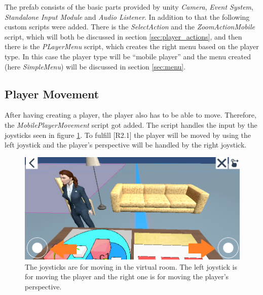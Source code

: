 The \gls{prefab} consists of the basic parts provided by \gls{unity} \textit{Camera}, \textit{Event System}, \textit{Standalone Input Module} and \textit{Audio Listener}.
In addition to that the following custom scripts were added.
There is the \textit{SelectAction} and the \textit{ZoomActionMobile} script, which will both be discussed in section \ref{sec:player_actions}, and then there is the \textit{PLayerMenu} script, which creates the right menu based on the player type.
In this case the player type will be \enquote{mobile player} and the menu created (here \textit{SimpleMenu}) will be discussed in section \ref{sec:menu}.

\subsection{Player Movement}
\label{sec:player_movement}
After having creating a player, the player also has to be able to move.
Therefore, the \textit{MobilePlayerMovement} script got added.
The script handles the input by the joysticks seen in figure \ref{fig:joystick}.
To fulfill [R2.1] the player will be moved by using the left joystick and the player's perspective will be handled by the right joystick.

\begin{figure}[htb]
    \centering
    \includegraphics[width=1\textwidth]{Implementation/img/joysticks.png}
    \caption{The joysticks are for moving in the virtual room. The left joystick is for moving the player and the right one is for moving the player's perspective.}\label{fig:joystick}
\end{figure}

